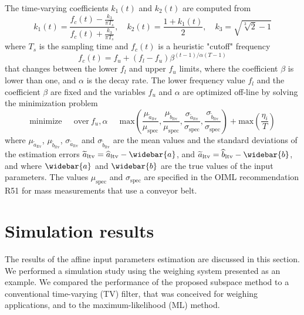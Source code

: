 The time-varying coefficients $k_1(t)$ and $k_2(t)$ are computed from
\begin{equation} k_1(t) = \frac{f_c(t) - \frac{k_3}{\pi T_s}}{f_c(t) + \frac{k_3}{\pi T_s}}, \quad k_2(t) = \frac{1 + k_1(t)}{2} , \quad k_3 = \sqrt{ \sqrt[3]{2}  - 1} \end{equation}
where $T_s$ is the sampling time and $f_c(t)$ is a heuristic "cutoff" frequency
\begin{equation} f_c(t) = f_u + \left( f_l - f_u \right) \beta^{\left( t-1 \right) /  \alpha \left( T-1 \right) } \end{equation}
that changes between the lower $f_l$ and upper $f_u$ limits, where the coefficient $\beta$ is lower than one, and $\alpha$ is the decay rate. 
The lower frequency value $f_l$ and the coefficient $\beta$ are fixed and the variables $f_u$ and $\alpha$ are optimized off-line by solving the minimization problem 
\begin{equation} \mathrm{minimize} \ \quad \ \mathrm{over} \ f_u, \alpha \ \quad \ \mathrm{max} \left( \dfrac{\mu_{\widetilde{a}_{\mathrm{ltv}}}}{\mu_{\mathrm{spec}}}, \dfrac{\mu_{\widetilde{b}_{\mathrm{ltv}}}}{\mu_{\mathrm{spec}}}, \dfrac{\sigma_{\widetilde{a}_{\mathrm{ltv}}}}{\sigma_{\mathrm{spec}}}, \dfrac{\sigma_{\widetilde{b}_{\mathrm{ltv}}}}{\sigma_{\mathrm{spec}}} \right) + \mathrm{max} \left( \dfrac{\eta_{i}}{T} \right) \label{eqn:tv_optim} \end{equation}
where $\mu_{\widetilde{a}_\mathrm{ltv}}$, $\mu_{\widetilde{b}_\mathrm{ltv}}$, $\sigma_{\widetilde{a}_\mathrm{ltv}}$ and $\sigma_{\widetilde{b}_\mathrm{ltv}}$ are the mean values and the standard deviations of the estimation errors $\widetilde{a}_\mathrm{ltv} = \widehat{a}_\mathrm{ltv} - \widebar{a}$, and $\widetilde{a}_\mathrm{ltv} = \widehat{b}_\mathrm{ltv} - \widebar{b}$, and where $\widebar{a}$ and $\widebar{b}$ are the true values of the input parameters.
The values $\mu_{\mathrm{spec}}$ and $\sigma_{\mathrm{spec}}$ are specified in the OIML recommendation R51 \citep{OIML_R51_1} for mass measurements that use a conveyor belt.


\section{Simulation results}
The results of the affine input parameters estimation are discussed in this section.
We performed a simulation study using the weighing system presented as an example.
We compared the performance of the proposed subspace method to a conventional time-varying (TV) filter, that was conceived for weighing applications, and to the maximum-likelihood (ML) method.

